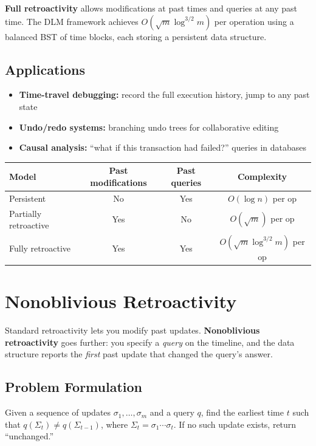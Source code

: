\textbf{Full retroactivity} allows modifications at past times and queries at any past time. The DLM framework achieves $O(\sqrt{m} \log^{3/2} m)$ per operation using a balanced BST of time blocks, each storing a persistent data structure.

\subsection{Applications}

\begin{itemize}
    \item \textbf{Time-travel debugging:} record the full execution history, jump to any past state
    \item \textbf{Undo/redo systems:} branching undo trees for collaborative editing
    \item \textbf{Causal analysis:} ``what if this transaction had failed?'' queries in databases
\end{itemize}

\begin{center}
\begin{tabular}{lccc}
\toprule
Model & Past modifications & Past queries & Complexity \\
\midrule
Persistent & No & Yes & $O(\log n)$ per op \\
Partially retroactive & Yes & No & $O(\sqrt{m})$ per op \\
Fully retroactive & Yes & Yes & $O(\sqrt{m} \log^{3/2} m)$ per op \\
\bottomrule
\end{tabular}
\end{center}

\section{Nonoblivious Retroactivity}
\label{sec21:nonoblivious-retroactivity}

Standard retroactivity lets you modify past updates. \textbf{Nonoblivious retroactivity} goes further: you specify a \emph{query} on the timeline, and the data structure reports the \emph{first} past update that changed the query's answer.

\subsection{Problem Formulation}

Given a sequence of updates $\sigma_1, \ldots, \sigma_m$ and a query $q$, find the earliest time $t$ such that $q(\Sigma_t) \ne q(\Sigma_{t-1})$, where $\Sigma_t = \sigma_1 \cdots \sigma_t$. If no such update exists, return ``unchanged.''

